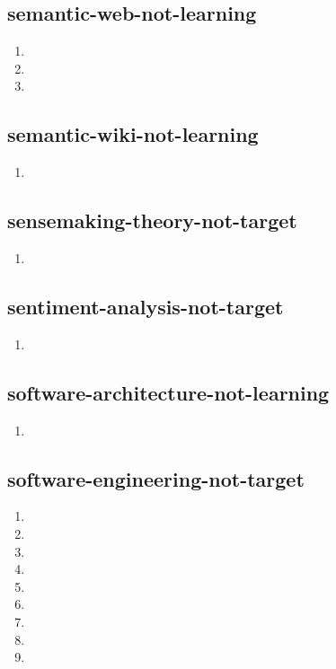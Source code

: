 \documentclass{article}
\begin{document}
\subsection{semantic-web-not-learning}
\begin{enumerate}
\item {}
\item {}
\item {}
\end{enumerate}

\subsection{semantic-wiki-not-learning}
\begin{enumerate}
\item {}
\end{enumerate}

\subsection{sensemaking-theory-not-target}
\begin{enumerate}
\item {}
\end{enumerate}

\subsection{sentiment-analysis-not-target}
\begin{enumerate}
\item {}
\end{enumerate}

\subsection{software-architecture-not-learning}
\begin{enumerate}
\item {}
\end{enumerate}

\subsection{software-engineering-not-target}
\begin{enumerate}
\item {}
\item {}
\item {}
\item {}
\item {}
\item {}
\item {}
\item {}
\item {}
\end{enumerate}
\end{document}
